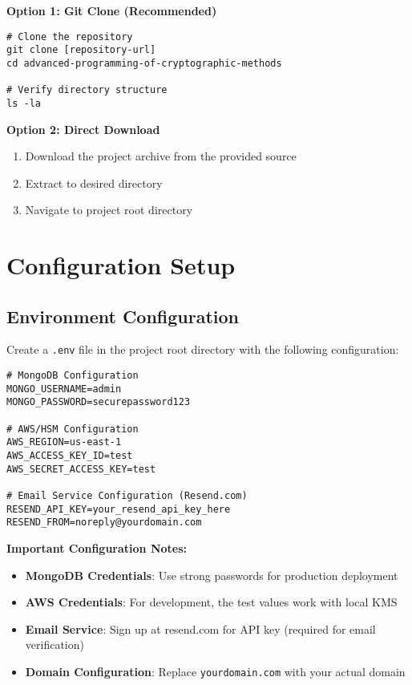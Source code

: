 \textbf{Option 1: Git Clone (Recommended)}
\begin{verbatim}
# Clone the repository
git clone [repository-url]
cd advanced-programming-of-cryptographic-methods

# Verify directory structure
ls -la
\end{verbatim}

\textbf{Option 2: Direct Download}
\begin{enumerate}
    \item Download the project archive from the provided source
    \item Extract to desired directory
    \item Navigate to project root directory
\end{enumerate}

\section{Configuration Setup}

\subsection{Environment Configuration}

Create a \texttt{.env} file in the project root directory with the following configuration:

\begin{verbatim}
# MongoDB Configuration
MONGO_USERNAME=admin
MONGO_PASSWORD=securepassword123

# AWS/HSM Configuration
AWS_REGION=us-east-1
AWS_ACCESS_KEY_ID=test
AWS_SECRET_ACCESS_KEY=test

# Email Service Configuration (Resend.com)
RESEND_API_KEY=your_resend_api_key_here
RESEND_FROM=noreply@yourdomain.com
\end{verbatim}

\textbf{Important Configuration Notes:}
\begin{itemize}
    \item \textbf{MongoDB Credentials}: Use strong passwords for production deployment
    \item \textbf{AWS Credentials}: For development, the test values work with local KMS
    \item \textbf{Email Service}: Sign up at resend.com for API key (required for email verification)
    \item \textbf{Domain Configuration}: Replace \texttt{yourdomain.com} with your actual domain
\end{itemize}

